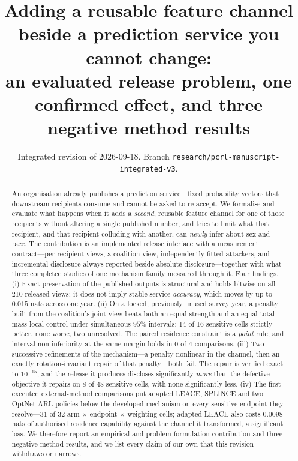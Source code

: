 \documentclass[10pt]{article}
\title{Adding a reusable feature channel beside a prediction service you cannot change:\\
an evaluated release problem, one confirmed effect, and three negative method results}
\author{}
\date{Integrated revision of 2026-09-18.
Branch \texttt{research/pcrl-manuscript-integrated-v3}.}
\begin{document}
\maketitle

\begin{abstract}
An organisation already publishes a prediction service---fixed probability vectors that downstream
recipients consume and cannot be asked to re-accept. We formalise and evaluate what happens when it
adds a \emph{second}, reusable feature channel for one of those recipients without altering a single
published number, and tries to limit what that recipient, and that recipient colluding with another,
can \emph{newly} infer about sex and race. The contribution is an implemented release interface with
a measurement contract---per-recipient views, a coalition view, independently fitted attackers, and
incremental disclosure always reported beside absolute disclosure---together with what three
completed studies of one mechanism family measured through it. Four findings. (i) Exact preservation
of the published outputs is structural and holds bitwise on all 210 released views; it does not imply
stable service \emph{accuracy}, which moves by up to $0.015$ nats across one year. (ii) On a locked,
previously unused survey year, a penalty built from the coalition's joint view beats both an
equal-strength and an equal-total-mass local control under simultaneous $95\%$ intervals: 14 of 16
sensitive cells strictly better, none worse, two unresolved. The paired residence constraint is a
\emph{point} rule, and interval non-inferiority at the same margin holds in $0$ of $4$ comparisons.
(iii) Two successive refinements of the mechanism---a penalty nonlinear in the channel, then an
exactly rotation-invariant repair of that penalty---both fail. The repair is verified exact to
$10^{-15}$, and the release it produces discloses significantly \emph{more} than the defective
objective it repairs on $8$ of $48$ sensitive cells, with none significantly less. (iv) The first
executed external-method comparisons put adapted LEACE, SPLINCE and two OptNet-ARL policies below
the developed mechanism on every sensitive endpoint they resolve---$31$ of $32$ arm $\times$
endpoint $\times$ weighting cells; adapted LEACE also costs $0.0098$ nats of authorised
residence capability against the channel it transformed, a significant loss. We therefore report an
empirical and problem-formulation contribution and three negative method results, and we list every
claim of our own that this revision withdraws or narrows.
\end{abstract}
\end{document}
